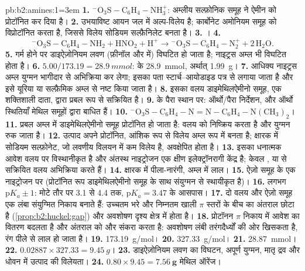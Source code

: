 \begin{solution}{pb:b2:amines:1}\emergencystretch=3em
\textbf{1.} $\mathrm{{}^-O_3S{-}C_6H_4{-}NH_3^+}$: अम्लीय सल्फ़ोनिक समूह ने ऐमीन को प्रोटॉनित कर दिया है।
\textbf{2.} उभयाविष्ट आयन जल में अल्प-विलेय है; कार्बोनेट अमोनियम समूह को विप्रोटॉनित करता है,
जिससे विलेय सोडियम सल्फ़ैनिलेट बनता है।
\textbf{3.} ।
\textbf{4.}
\[
  \mathrm{{}^-O_3S{-}C_6H_4{-}NH_2 + HNO_2 + H^+ \to {}^-O_3S{-}C_6H_4{-}N_2^+ + 2\,H_2O} .
\]
\textbf{5.} गर्म होने पर डाइऐज़ोनियम लवण (फ़ीनॉल और  में) विघटित हो जाता है; नाइट्रस अम्ल
भी विघटित होता है।
\textbf{6.} $5.00/173.19 = \qty{28.9}{mmol}$:  के \qty{28.9}{mmol}, अर्थात् \qty{1.99}{g}।
\textbf{7.} आधिक्य नाइट्रस अम्ल युग्मन भागीदार से अभिक्रिया कर लेगा; इसका पता स्टार्च--आयोडाइड
पत्र से लगाया जाता है और इसे यूरिया या सल्फ़ैमिक अम्ल से नष्ट किया जाता है।
\textbf{8.} इसका वलय डाइमेथिलऐमीनो समूह, एक शक्तिशाली दाता, द्वारा प्रबल रूप से सक्रियित है।
\textbf{9.}  के पैरा स्थान पर: ऑर्थो/पैरा निर्देशन, और ऑर्थो स्थितियाँ
मेथिल समूहों द्वारा बाधित हैं।
\textbf{10.} $\mathrm{{}^-O_3S{-}C_6H_4{-}N{=}N{-}C_6H_4{-}N(CH_3)_2}$।
\textbf{11.} प्रबल अम्ल में डाइमेथिलऐमीनो समूह प्रोटॉनित हो जाता है:  वलय को निष्क्रिय करता है
और युग्मन रुक जाता है।
\textbf{12.} उत्पाद अपने प्रोटॉनित, आंशिक रूप से विलेय अम्ल रूप में बनता है; क्षारक में सोडियम
सल्फ़ोनेट, जो लवणीय विलयन में कम विलेय है, अवक्षेपित होता है।
\textbf{13.} इसका धनात्मक आवेश वलय पर विस्थानीकृत है और अंतस्थ नाइट्रोजन एक क्षीण
इलेक्ट्रॉनरागी केंद्र है; केवल ,  या  से सक्रियित वलय अभिक्रिया करते हैं।
\textbf{14.} क्षारक में पीला-नारंगी, अम्ल में लाल।
\textbf{15.} ऐज़ो समूह के एक नाइट्रोजन पर (प्रोटॉनित रूप डाइमेथिलऐमीनो समूह के साथ संयुग्मन से
स्थायीकृत है)।
\textbf{16.} लगभग $\mathrm pK_a \pm 1$: मोटे तौर पर 3.1 से 4.4 तक, $\mathrm pK_a = 3.47$ के आसपास।
\textbf{17.} दो वलय और ऐज़ो समूह एक लंबा संयुग्मित निकाय बनाते हैं: उच्चतम
भरे और निम्नतम खाली $\pi$ स्तरों के बीच का अंतराल छोटा है (\cref{prop:b2:huckel:gap}) और अवशोषण
दृश्य क्षेत्र में होता है।
\textbf{18.} प्रोटॉनन $\pi$ निकाय में आवेश का वितरण बदलता है और अंतराल को और संकरा
करता है: अवशोषण लंबी तरंगदैर्ध्यों की ओर खिसकता है, रंग पीले से लाल हो जाता है।
\textbf{19.} \qty{173.19}{g/mol}।
\textbf{20.} \qty{327.33}{g/mol}।
\textbf{21.} \qty{28.87}{mmol}।
\textbf{22.} $0.02887 \times 327.33 = \qty{9.45}{g}$।
\textbf{23.} डाइऐज़ोनियम लवण का विघटन, अपूर्ण युग्मन, मातृ द्रव और धोवन में
उत्पाद की विलेयता।
\textbf{24.} $0.80 \times 9.45 = \boldsymbol{\qty{7.56}{g}}$ मेथिल ऑरेंज।
\end{solution}
